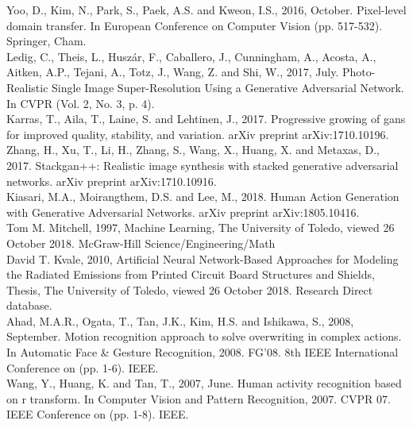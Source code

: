 \newline
[21] Yoo, D., Kim, N., Park, S., Paek, A.S. and Kweon, I.S., 2016, October. Pixel-level domain transfer. In European Conference on Computer Vision (pp. 517-532). Springer, Cham.\\
\newline
[22] Ledig, C., Theis, L., Huszár, F., Caballero, J., Cunningham, A., Acosta, A., Aitken, A.P., Tejani, A., Totz, J., Wang, Z. and Shi, W., 2017, July. Photo-Realistic Single Image Super-Resolution Using a Generative Adversarial Network. In CVPR (Vol. 2, No. 3, p. 4).\\
\newline
[23] Karras, T., Aila, T., Laine, S. and Lehtinen, J., 2017. Progressive growing of gans for improved quality, stability, and variation. arXiv preprint arXiv:1710.10196.\\
\newline
[24] Zhang, H., Xu, T., Li, H., Zhang, S., Wang, X., Huang, X. and Metaxas, D., 2017. Stackgan++: Realistic image synthesis with stacked generative adversarial networks. arXiv preprint arXiv:1710.10916.\\
\newline
[25] Kiasari, M.A., Moirangthem, D.S. and Lee, M., 2018. Human Action Generation with Generative Adversarial Networks. arXiv preprint arXiv:1805.10416.\\
\newline
[26] Tom M. Mitchell, 1997, Machine Learning, The University of Toledo, viewed 26 October 2018. McGraw-Hill Science/Engineering/Math\\
\newline
[27] David T. Kvale, 2010, Artificial Neural Network-Based Approaches for Modeling the Radiated Emissions from Printed Circuit Board Structures and Shields, Thesis, The University of Toledo, viewed 26 October 2018. Research Direct database.\\
\newline
[28] Ahad, M.A.R., Ogata, T., Tan, J.K., Kim, H.S. and Ishikawa, S., 2008, September. Motion recognition approach to solve overwriting in complex actions. In Automatic Face & Gesture Recognition, 2008. FG'08. 8th IEEE International Conference on (pp. 1-6). IEEE.\\
\newline
[29] Wang, Y., Huang, K. and Tan, T., 2007, June. Human activity recognition based on r transform. In Computer Vision and Pattern Recognition, 2007. CVPR 07. IEEE Conference on (pp. 1-8). IEEE.\\
